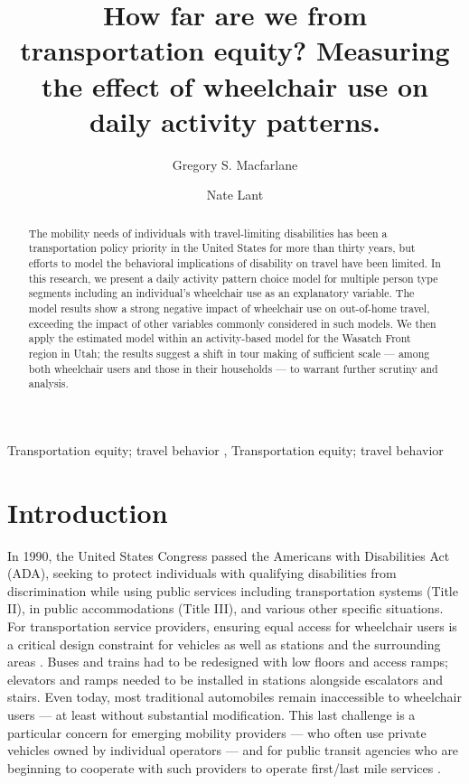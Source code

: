 \documentclass[3p, authoryear, review]{elsarticle} %
\begin{document}
\begin{frontmatter}

  \title{How far are we from transportation equity? Measuring the effect of wheelchair use on daily activity patterns.}
    \author[BYU]{Gregory S. Macfarlane%
  }
    \author[BYU]{Nate Lant%
  }
  
  \begin{abstract}
  The mobility needs of individuals with travel-limiting disabilities has been a transportation policy priority in the United States for more than thirty years, but efforts to model the behavioral implications of disability on travel have been limited. In this research, we present a daily activity pattern choice model for multiple person type segments including an individual's wheelchair use as an explanatory variable. The model results show a strong negative impact of wheelchair use on out-of-home travel, exceeding the impact of other variables commonly considered in such models. We then apply the estimated model within an activity-based model for the Wasatch Front region in Utah; the results suggest a shift in tour making of sufficient scale --- among both wheelchair users and those in their households --- to warrant further scrutiny and analysis.
  \end{abstract}
    \begin{keyword}
    Transportation equity; travel behavior \sep 
    Transportation equity; travel behavior
  \end{keyword}
  
 \end{frontmatter}

\hypertarget{intro}{%
\section{Introduction}\label{intro}}

In 1990, the United States Congress passed the Americans with Disabilities Act (ADA),
seeking to protect individuals with qualifying disabilities from discrimination
while using public services including transportation systems (Title II), in
public accommodations (Title III), and various other specific situations. For
transportation service providers, ensuring equal access for wheelchair users is
a critical design constraint for vehicles as well as stations and the surrounding areas
\citep{fhwaada}.
Buses and trains had to be redesigned with low floors and access ramps;
elevators and ramps needed to be installed in stations alongside escalators and
stairs. Even today, most traditional automobiles remain inaccessible to wheelchair users --- at least
without substantial modification. This last challenge is
a particular concern for emerging mobility providers --- who often use
private vehicles owned by individual operators --- and for public transit agencies who
are beginning to cooperate with such providers to operate first/last mile
services \citep{Shaheen2016, Macfarlane2021}.
\end{document}
